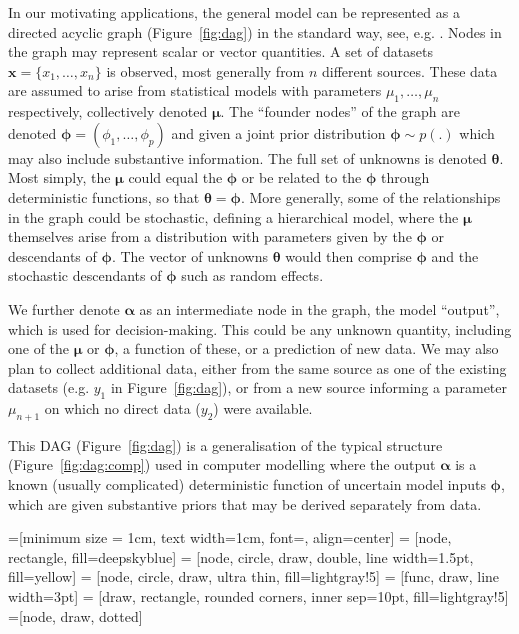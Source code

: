\documentclass[12pt]{article}\usepackage[]{graphicx}\usepackage[]{color}
\newcommand{\x}{\mathbf{x}}
\begin{document}
In our motivating applications, the general model can be represented as a directed acyclic graph (Figure~\ref{fig:dag}) in the standard way, see, e.g. \citet{lauritzen1996graphical}.  Nodes in the graph may represent scalar or vector quantities.   A set of datasets $\x = \{x_1,\ldots,x_n\}$ is observed, most generally from $n$ different sources.  These data are assumed to arise from statistical models with parameters $\mu_1,\ldots,\mu_n$ respectively, collectively denoted $\bm\mu$.  The ``founder nodes'' of the graph are denoted $\bm\phi = (\phi_1,\ldots,\phi_p)$ and given a joint prior distribution $\bm\phi \sim p(.)$ which may also include substantive information.  The full set of unknowns is denoted $\bm\theta$.  Most simply, the $\bm\mu$ could equal the $\bm\phi$ or be related to the $\bm\phi$ through deterministic functions, so that $\bm\theta=\bm\phi$.  More generally, some of the relationships in the graph could be stochastic, defining a hierarchical model, where the $\bm\mu$ themselves arise from a distribution with parameters given by the $\bm\phi$ or descendants of $\bm\phi$.  The vector of unknowns $\bm\theta$ would then comprise $\bm\phi$ and the stochastic descendants of $\bm\phi$ such as random effects. 

We further denote $\bm\alpha$ as an intermediate node in the graph, the model ``output'', which is used for decision-making.  This could be any unknown quantity, including one of the $\bm\mu$ or $\bm\phi$, a function of these, or a prediction of new data.  We may also plan to collect additional data, either from the same source as one of the existing datasets (e.g. $y_1$ in Figure~\ref{fig:dag}), or from a new source informing a parameter $\mu_{n+1}$ on which no direct data ($y_2$) were available.

This DAG (Figure~\ref{fig:dag}) is a generalisation of the typical structure (Figure~\ref{fig:dag:comp}) used in computer modelling \citep{oakley:ohagan:psa} where the output $\bm\alpha$ is a known (usually complicated) deterministic function of uncertain model inputs $\bm\phi$, which are given substantive priors that may be derived separately from data. 

 =[minimum size = 1cm, text width=1cm, font=\normalsize, align=center]
    = [node, rectangle, fill=deepskyblue]
 = [node, circle, draw, double, line width=1.5pt, fill=yellow]
   = [node, circle, draw, ultra thin, fill=lightgray!5]  %
= [func, draw, line width=3pt]
= [draw, rectangle, rounded corners, inner sep=10pt, fill=lightgray!5]
=[node, draw, dotted]
\end{document}
